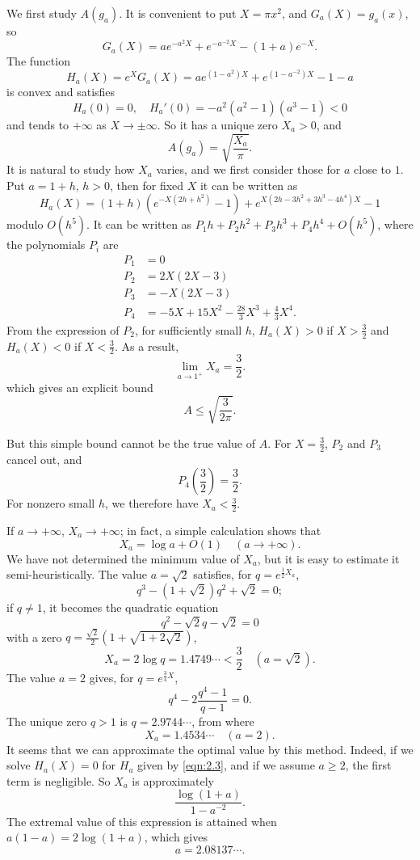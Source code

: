 We first study $A(g_{a})$.
It is convenient to put $X = \pi x^2$, and $G_{a}(X) = g_{a}(x)$, so
\[
    G_{a}(X) = a e^{-a^{2}X} + e^{-a^{-2}X} - (1 + a)e^{-X}.
\]
The function
\begin{equation}
    \label{eqn:2.3}
    H_{a}(X) = e^{X} G_{a}(X) = a e^{(1 - a^{2})X} + e^{(1 - a^{-2})X} - 1 - a
\end{equation}
is convex and satisfies
\[
    H_{a}(0) = 0, \quad H_{a}'(0) = -a^{2}(a^{2} - 1)(a^{3} - 1) < 0
\]
and tends to $+\infty$ as $X \to \pm \infty$.
So it has a unique zero $X_{a} > 0$, and
\[
    A(g_{a}) = \sqrt{\frac{X_{a}}{\pi}}.
\]
It is natural to study how $X_{a}$ varies, and we first consider those for $a$ close to $1$.
Put $a = 1 + h$, $h > 0$, then for fixed $X$ it can be written as
\[
    H_{a}(X) = (1 + h)(e^{-X(2h + h^2)} - 1) + e^{X(2h - 3h^{2} + 3h^{3} - 4h^{4})X} - 1
\]
modulo $O(h^{5})$.
It can be written as $P_{1}h + P_{2}h^{2} + P_{3}h^{3} + P_{4}h^{4} + O(h^{5})$, where the polynomials $P_{i}$ are
\begin{align*}
    P_{1} &= 0 \\
    P_{2} &= 2X(2X - 3)\\
    P_{3} &= -X(2X - 3) \\
    P_{4} &= -5X + 15 X^{2} - \frac{28}{3} X^{3} + \frac{4}{3}X^{4}.
\end{align*}
From the expression of $P_{2}$, for sufficiently small $h$, $H_a(X) > 0$ if $X > \frac{3}{2}$ and $H_a(X) < 0$ if $X < \frac{3}{2}$.
As a result,
\begin{equation}
    \label{eqn:2.4}
    \lim_{a \to 1^+} X_a = \frac{3}{2}.
\end{equation}
which gives an explicit bound
\begin{equation}
    \label{eqn:2.5}
    A \leq \sqrt{\frac{3}{2 \pi}}.
\end{equation}

But this simple bound cannot be the true value of $A$.
For $X = \frac{3}{2}$, $P_2$ and $P_3$ cancel out, and
\[
    P_4\left(\frac{3}{2}\right) = \frac{3}{2}.
\]
For nonzero small $h$, we therefore have $X_a < \frac{3}{2}$.

If $a \to +\infty$, $X_a \to +\infty$; in fact, a simple calculation shows that
\[
    X_a = \log a + O(1) \quad (a \to +\infty).
\]
We have not determined the minimum value of $X_a$, but it is easy to estimate it semi-heuristically.
The value $a = \sqrt{2}$ satisfies, for $q = e^{\frac{1}{2}X_a}$,
\[
    q^3 - (1+\sqrt{2})q^2 + \sqrt{2} = 0;
\]
if $q \neq 1$, it becomes the quadratic equation
\[
    q^2 - \sqrt{2} q - \sqrt{2} = 0
\]
with a zero $q = \frac{\sqrt{2}}{2}(1 + \sqrt{1+2\sqrt{2}})$,
\[
    X_a = 2 \log q = 1.4749\cdots < \frac{3}{2}\quad(a = \sqrt{2}).
\]
The value $a = 2$ gives, for $q = e^{\frac{3}{4}X}$,
\[
    q^4 - 2 \frac{q^4 - 1}{q - 1} = 0.
\]
The unique zero $q > 1$ is $q = 2.9744\cdots$, from where
\[
    X_a = 1.4534\cdots\quad(a = 2).
\]
It seems that we can approximate the optimal value by this method.
Indeed, if we solve $H_a(X) = 0$ for $H_a$ given by \eqref{eqn:2.3}, and if we assume $a \geq 2$, the first term is negligible.
So $X_a$ is approximately
\[
    \frac{\log(1+a)}{1 - a^{-2}}.
\]
The extremal value of this expression is attained when $a(1-a) = 2 \log(1+a)$, which gives
\[
    a = 2.08137\cdots.
\]

